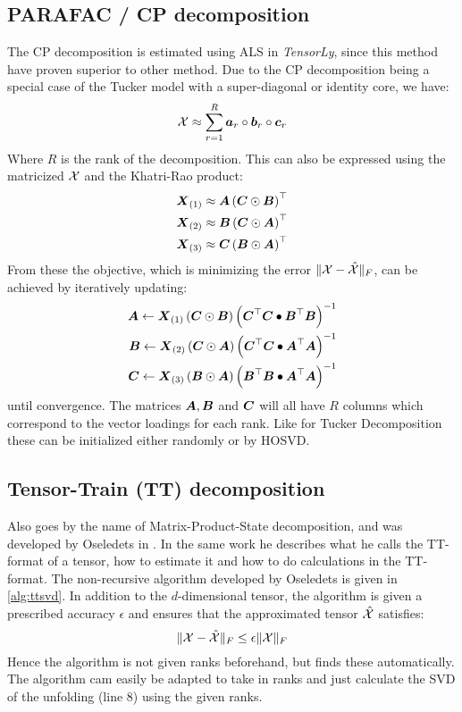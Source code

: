 \subsection{PARAFAC / CP decomposition}
The CP decomposition is estimated using ALS in \textit{TensorLy}, since this method have proven superior to other method\cite[29]{Mørup2011}. Due to the CP decomposition being a special case of the Tucker model with a super-diagonal or identity core, we have:
\begin{equation}
    \mathcal{X} \approx \sum_{r=1}^R \boldsymbol{a}_r \circ \boldsymbol{b}_r \circ \boldsymbol{c}_r
\end{equation}
Where $R$ is the rank of the decomposition. This can also be expressed using the matricized $\mathcal{X}$ and the Khatri-Rao product:
\begin{align}
    \boldsymbol{X}_{(1)} &\approx \boldsymbol{A}\left( \boldsymbol{C} \odot \boldsymbol{B}\right)^\top \\
    \boldsymbol{X}_{(2)} &\approx \boldsymbol{B}\left( \boldsymbol{C} \odot \boldsymbol{A}\right)^\top \\
    \boldsymbol{X}_{(3)} &\approx \boldsymbol{C}\left( \boldsymbol{B} \odot \boldsymbol{A}\right)^\top
\end{align}
From these the objective, which is minimizing the error $\| \mathcal{X} - \hat{\mathcal{X}}\|_F$, can be achieved by iteratively updating:
\begin{align}
    \boldsymbol{A} \leftarrow \boldsymbol{X}_{(1)}\left( \boldsymbol{C} \odot \boldsymbol{B} \right)\left(
    \boldsymbol{C}^\top \boldsymbol{C} \bullet \boldsymbol{B}^\top \boldsymbol{B}\right)^{-1} \\
    \boldsymbol{B} \leftarrow \boldsymbol{X}_{(2)}\left( \boldsymbol{C} \odot \boldsymbol{A} \right)\left(
    \boldsymbol{C}^\top \boldsymbol{C} \bullet \boldsymbol{A}^\top \boldsymbol{A}\right)^{-1} \\
    \boldsymbol{C} \leftarrow \boldsymbol{X}_{(3)}\left( \boldsymbol{B} \odot \boldsymbol{A} \right)\left(
    \boldsymbol{B}^\top \boldsymbol{B} \bullet \boldsymbol{A}^\top \boldsymbol{A}\right)^{-1}
\end{align}
until convergence\cite[28]{Kolda2007}. The matrices $\boldsymbol{A}, \boldsymbol{B}$ and $\boldsymbol{C}$ will all have $R$ columns which correspond to the vector loadings for each rank. Like for Tucker Decomposition these can be initialized either randomly or by HOSVD.

\subsection{Tensor-Train (TT) decomposition}
Also goes by the name of Matrix-Product-State decomposition, and was developed by Oseledets in \cite{Oseledets2011}. In the same work he describes what he calls the TT-format of a tensor, how to estimate it and how to do calculations in the TT-format. The non-recursive algorithm developed by Oseledets is given in \autoref{alg:ttsvd}. In addition to the $d$-dimensional tensor, the algorithm is given a prescribed accuracy $\epsilon$ and ensures that the approximated tensor $\hat{\mathcal{X}}$ satisfies:
\begin{equation}
    \| \mathcal{X}-\hat{\mathcal{X}} \|_F \leq \epsilon \| \mathcal{X} \|_F
\end{equation}
Hence the algorithm is not given ranks beforehand, but finds these automatically. The algorithm cam easily be adapted to take in ranks and just calculate the SVD of the unfolding (line 8) using the given ranks.


